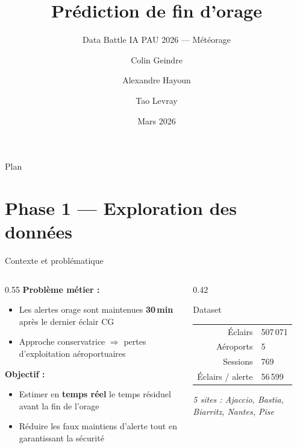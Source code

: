\documentclass[aspectratio=169,10pt]{beamer}
\title{Prédiction de fin d'orage}
\subtitle{Data Battle IA PAU 2026 — Météorage}
\date{Mars 2026}
\author{Colin Geindre \and Alexandre Hayoun \and Tao Levray}
\institute{Équipe : \textbf{Les Vieux Briscards}}
\newcommand{\hig}[1]{\textcolor{meteoRed}{\textbf{#1}}}
\begin{document}
\maketitle

\begin{frame}{Plan}
\tableofcontents
\end{frame}


\section{Phase 1 — Exploration des données}

\begin{frame}{Contexte et problématique}
\begin{columns}[T]
\begin{column}{0.55\textwidth}
\textbf{Problème métier :}
\begin{itemize}
  \item Les alertes orage sont maintenues \hig{30\,min} après le dernier éclair CG
  \item Approche conservatrice $\Rightarrow$ pertes d'exploitation aéroportuaires
\end{itemize}

\vspace{0.8em}
\textbf{Objectif :}
\begin{itemize}
  \item Estimer en \textbf{temps réel} le temps résiduel avant la fin de l'orage
  \item Réduire les faux maintiens d'alerte tout en garantissant la sécurité
\end{itemize}
\end{column}
\begin{column}{0.42\textwidth}
\begin{block}{Dataset}
\small
\begin{tabular}{@{}rl@{}}
Éclairs  & 507\,071 \\
Aéroports & 5 \\
Sessions  & 769 \\
Éclairs / alerte & 56\,599 \\
\end{tabular}
\end{block}

\vspace{0.5em}
\small\textit{5 sites : Ajaccio, Bastia, Biarritz, Nantes, Pise}
\end{column}
\end{columns}
\end{frame}
\end{document}
